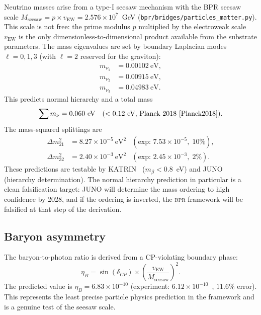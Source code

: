 \documentclass[aps,prd,twocolumn,superscriptaddress,longbibliography,nofootinbib]{revtex4-2}
\newcommand{\vEW}{v_{\mathrm{EW}}}
\newcommand{\bpr}{\textsc{bpr}}
\begin{document}
Neutrino masses arise from a type-I seesaw mechanism with the BPR
seesaw scale $M_{\mathrm{seesaw}} = p \times \vEW = 2.576 \times
10^7$~GeV (\texttt{bpr/bridges/particles\_matter.py}).  This scale
is not free: the prime modulus $p$ multiplied by the electroweak
scale $\vEW$ is the only dimensionless-to-dimensional product
available from the substrate parameters.  The mass
eigenvalues are set by boundary Laplacian modes $\ell = 0, 1, 3$
(with $\ell = 2$ reserved for the graviton):
\begin{align}
m_{\nu_1} &= 0.00102~\text{eV}, \nonumber \\
m_{\nu_2} &= 0.00915~\text{eV}, \nonumber \\
m_{\nu_3} &= 0.04983~\text{eV}.
\label{eq:neutrino_masses}
\end{align}
This predicts normal hierarchy and a total mass
\begin{equation}
\sum m_\nu = 0.060~\text{eV} \quad (< 0.12~\text{eV, Planck
2018~\cite{Planck2018}}).
\label{eq:sum_mnu}
\end{equation}
The mass-squared splittings are
\begin{align}
\Delta m^2_{21} &= 8.27 \times 10^{-5}~\text{eV}^2
  &\!\!\!(\text{exp: } 7.53 \times 10^{-5},\; 10\%), \nonumber \\
\Delta m^2_{32} &= 2.40 \times 10^{-3}~\text{eV}^2
  &\!\!\!(\text{exp: } 2.45 \times 10^{-3},\; 2\%).
\label{eq:dm2}
\end{align}
These predictions are testable by KATRIN~\cite{KATRIN2022}
($m_\beta < 0.8$~eV) and JUNO~\cite{JUNO2022} (hierarchy
determination).  The normal hierarchy prediction in particular is
a clean falsification target: JUNO will determine the mass ordering
to high confidence by 2028, and if the ordering is inverted,
the \bpr{} framework will be falsified at that step of the derivation.

\subsection{Baryon asymmetry}

The baryon-to-photon ratio is derived from a CP-violating boundary
phase:
\begin{equation}
\eta_B = \sin(\delta_{CP}) \times
  \left(\frac{\vEW}{M_{\mathrm{seesaw}}}\right)^{\!2}.
\label{eq:etaB}
\end{equation}
The predicted value is $\eta_B = 6.83 \times 10^{-10}$ (experiment:
$6.12 \times 10^{-10}$~\cite{Planck2018}, $11.6\%$ error).  This
represents the least precise particle physics prediction in the
framework and is a genuine test of the seesaw scale.
\end{document}
